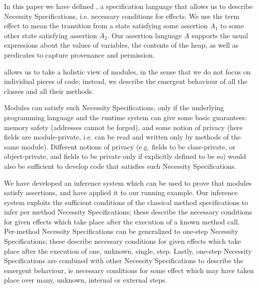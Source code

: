 


In this paper we have defined \Chainmail, a specification language that allows us to
describe Necessity Specifications, i.e. necessary  conditions for effects.
We use the term  effect to mean the transition from a  state satisfying some assertion 
$A_1$ to some  other state satisfying  assertion $A_2$. 
Our assertion language $A$ supports the usual expressions about the values of
variables, the contents of the heap, as well as predicates to capture provenance 
and permission.

\Chainmail allows us to take a holistic view of modules, in the sense that we do not focus
on individual pieces of code; instead, we  describe  the emergent behaviour of all
the classes and all their methods. 

Modules can satisfy such Necessity Specifications, only if
the underlying programming language and the runtime system 
can give some basic guarantees:
 memory safety (addresses cannot be forged), 
and some notion of privacy (here fields are module-private, i.e. can be read and written only
by methods of the same module). Different notions of privacy 
(e.g. fields to be class-private,
or object-private, and fields to be private only if explicitly defined to be so)  would
also be sufficient to develop code that satisfies such Necessity Specifications.

We have developed an inference system which can be used to prove that modules satisfy  
\Chainmail assertions, and have applied it to our running example. 
Our inference system exploits the sufficient conditions of the classical
method specifications to infer per method Necessity Specifications;  
these describe the necessary conditions for given effects
which take place after the execution of a known method call. 
Per-method Necessity Specifications can be generalized to one-step
 Necessity Specifications; these describe necessary conditions for
 given effects  which take place after the execution of one, 
 unknown, single, step. 
 Lastly, one-step
Necessity Specifications are combined with other Necessity Specifications
 to describe the emergent behaviour, ie  necessary conditions for some effect which
 may have taken place over many, unknown, internal or external steps.
 
